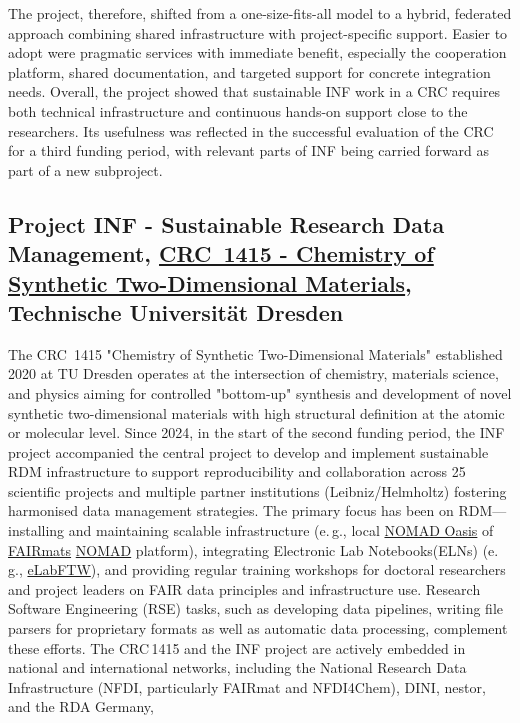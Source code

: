 \documentclass{eceasst}
\newcommand{\eg}{e.\,g.}
\begin{document}
The project, therefore, shifted from a one-size-fits-all model to a hybrid, federated approach combining shared infrastructure with project-specific support.
Easier to adopt were pragmatic services with immediate benefit, especially the cooperation platform, shared documentation, and targeted support for concrete integration needs.
Overall, the project showed that sustainable INF work in a CRC requires both technical infrastructure and continuous hands-on support close to the researchers.
Its usefulness was reflected in the successful evaluation of the CRC for a third funding period, with relevant parts of INF being carried forward as part of a new subproject.

\subsection{Project INF - Sustainable Research Data Management, \href{https://gepris.dfg.de/gepris/projekt/417590517?language=en}{CRC~1415 -  Chemistry of Synthetic Two-Dimensional Materials}, Technische Universität Dresden}
\label{subsec:crc1415}
The CRC~1415 "Chemistry of Synthetic Two-Dimensional Materials" established 2020 at TU Dresden operates at the intersection of chemistry, materials science, and physics
 aiming for controlled "bottom-up" synthesis and development of novel synthetic two-dimensional materials with high structural definition at the atomic or molecular level.
Since 2024, in the start of the second funding period, the INF project accompanied the central project to develop and implement sustainable RDM
infrastructure to support reproducibility and collaboration across 25 scientific projects and multiple partner institutions (Leibniz/Helmholtz) fostering harmonised data management strategies.
The primary focus has been on RDM—installing and maintaining scalable infrastructure
(\eg, local \href{https://nomad-lab.eu/nomad-lab/nomad-oasis.html}{NOMAD Oasis} of \href{https://www.fairmat-nfdi.eu/fairmat/}{FAIRmats} \href{https://nomad-lab.eu/nomad-lab/nomad.html}{NOMAD} platform),
integrating Electronic Lab Notebooks(ELNs) (\eg, \href{https://www.elabftw.net/}{eLabFTW}),
and providing regular training workshops for doctoral researchers and project leaders on FAIR data principles and infrastructure use.
Research Software Engineering (RSE) tasks, such as developing data pipelines, writing file parsers for proprietary formats as well as automatic data processing, complement these efforts.
The CRC\,1415 and the INF project are actively embedded in national and international networks,
including the National Research Data Infrastructure (NFDI, particularly FAIRmat and NFDI4Chem), DINI, nestor, and the RDA Germany,
\end{document}
